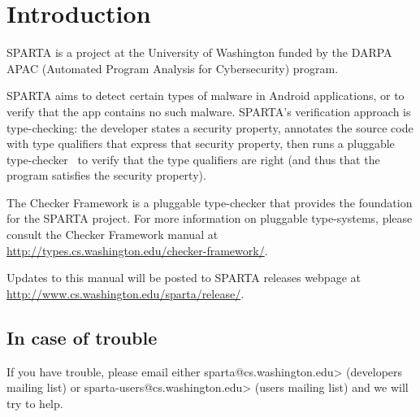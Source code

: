 \htmlhr
\chapter{Introduction\label{introduction}}

SPARTA is a project at the University of Washington funded by the DARPA
APAC (Automated Program Analysis for Cybersecurity) program.


SPARTA aims to detect certain types of malware in Android applications, or
to verify that the app contains no such malware.  SPARTA's verification
approach is type-checking:  the developer states a security property,
annotates the source code with type qualifiers that express that security
property, then runs a pluggable type-checker~\cite{PapiACPE2008,DietlDEMS2011} to verify that the type
qualifiers are right (and thus that the program satisfies the security
property).


The Checker Framework is a pluggable type-checker that provides the foundation for the SPARTA project. 
For more information on pluggable type-systems, please consult the Checker Framework manual at 
\url{http://types.cs.washington.edu/checker-framework/}.  


Updates to this manual will be posted to SPARTA releases webpage at
\url{http://www.cs.washington.edu/sparta/release/}.


\section{In case of trouble}

If you have trouble, please email either
\<sparta@cs.washington.edu>
(developers mailing list) or
\<sparta-users@cs.washington.edu> (users
mailing list) and we will try to help.






